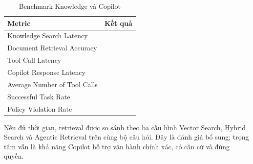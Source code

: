 \begin{table}[H]
\centering
\caption{Benchmark Knowledge và Copilot}
\label{tab:copilot-benchmark}
\begin{tabularx}{\textwidth}{L{8cm}Y}
\toprule
\textbf{Metric} & \textbf{Kết quả}\\
\midrule
Knowledge Search Latency & \cbs{}\\
Document Retrieval Accuracy & \cbs{}\\
Tool Call Latency & \cbs{}\\
Copilot Response Latency & \cbs{}\\
Average Number of Tool Calls & \cbs{}\\
Successful Task Rate & \cbs{}\\
Policy Violation Rate & \cbs{}\\
\bottomrule
\end{tabularx}
\end{table}

Nếu đủ thời gian, retrieval được so sánh theo ba cấu hình Vector Search, Hybrid
Search và Agentic Retrieval trên cùng bộ câu hỏi. Đây là đánh giá bổ sung; trọng
tâm vẫn là khả năng Copilot hỗ trợ vận hành chính xác, có căn cứ và đúng quyền.